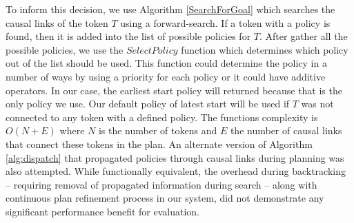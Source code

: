 To inform this decision, we use Algorithm \ref{SearchForGoal} which
searches the causal links of the token $T$ using a forward-search. 
If a token with a policy is found, then it is added into the list of possible policies for $T$. 
After gather all the possible policies, we use the $SelectPolicy$ function which
determines which policy out of the list should be used. This function could determine the policy in a number
of ways by using a priority for each policy or it could have additive operators. In our case, the
earliest start policy will returned because that is the only policy we use. Our default policy of latest start will be used
if $T$ was not connected to any token with a defined policy. 
The functions complexity is $O(N+E)$ \cite{corman} where $N$ is the
number of tokens and $E$ the number of causal links that connect these
tokens in the plan. An alternate version of Algorithm
\ref{alg:dispatch} that propagated policies through causal links
during planning was also attempted. While functionally equivalent, the
overhead during backtracking -- requiring removal of propagated
information during search -- along with continuous plan refinement
process in our system, did not demonstrate any significant performance
benefit for evaluation.



